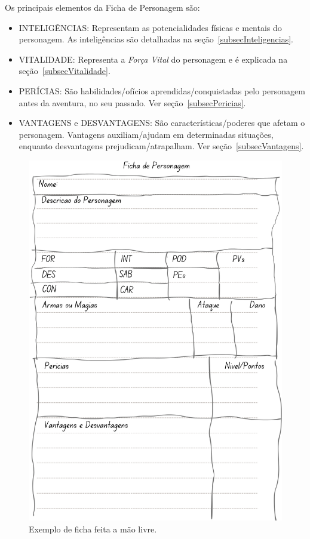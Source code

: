Os principais elementos da Ficha de Personagem são: 
\begin{itemize}
	\item INTELIGÊNCIAS: Representam as potencialidades físicas e mentais do personagem. As inteligências são detalhadas na seção~\ref{subsecInteligencias}.
	\item VITALIDADE: Representa a \emph{Força Vital} do personagem e é explicada na seção~\ref{subsecVitalidade}.
	\item PERÍCIAS: São habilidades/ofícios aprendidas/conquistadas pelo personagem antes da aventura, no seu passado. Ver seção~\ref{subsecPericias}.
	\item VANTAGENS e DESVANTAGENS: São características/poderes que afetam o personagem. Vantagens auxiliam/ajudam em determinadas situações, enquanto desvantagens prejudicam/atrapalham.  Ver seção~\ref{subsecVantagens}.
\end{itemize}

\begin{figure}[htb]
	\centering\smaller
	\includegraphics[scale=0.9]{img/fichaManual2.png}
	\caption{Exemplo de ficha feita a mão livre.}
	\label{fichaMaoLivre}
\end{figure}


